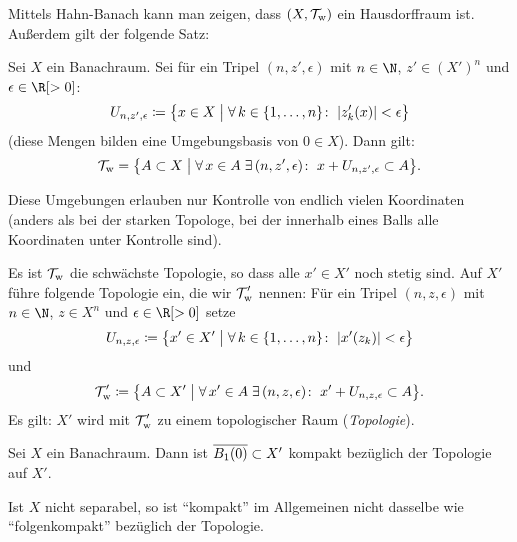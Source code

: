 \nnBemerkung
Mittels Hahn-Banach kann man zeigen, dass $(X,\operatorname{\mathcal{T}}_{\mkern-5mu\mathrm{w}})$ ein 
Hausdorffraum ist. Außerdem gilt der folgende Satz:

\begin{thSatz}
    Sei $X$ ein Banachraum.
    Sei für ein Tripel  $(n,z',\epsilon)$ mit $n\in\N$, 
    $z'\in (X')^n$ und $\epsilon\in\R[>0]$:
    \[ U_{n,z',\epsilon} \coloneqq \bigl\{
        x\in X \;\big\vert\; \forall\,k\in\{1,\ldots,n\}\colon \;
        \lvert z_k'(x)\rvert < \epsilon
        \bigr\}
    \]
    (diese Mengen bilden eine Umgebungsbasis von $0\in X$).
    Dann gilt:
    \[ \operatorname{\mathcal{T}}_{\mkern-5mu\mathrm{w}} = \bigl\{ A\subset X \;\big\vert\;
        \forall\,x\in A\; \exists\, (n,z',\epsilon)\colon\;
        x + U_{n,z',\epsilon} \subset A
        \bigr\}
    . \]
\end{thSatz}


%    

Diese Umgebungen erlauben nur Kontrolle von endlich vielen Koordinaten
(anders als bei der starken Topologe, bei der innerhalb eines Balls alle
Koordinaten unter Kontrolle sind).

\nnBemerkung
Es ist $\operatorname{\mathcal{T}}_{\mkern-5mu\mathrm{w}}$ die schwächste Topologie, so dass alle $x'\in X'$ noch stetig
sind. Auf $X'$ führe folgende Topologie ein, die wir $\operatorname{\mathcal{T}}_{\mkern-5mu\mathrm{w}}'$ nennen:
Für ein Tripel $(n,z,\epsilon)$ mit $n\in\N$, $z\in X^n$ und
$\epsilon\in\R[>0]$ setze
\[ U_{n,z,\epsilon} \coloneqq \bigl\{
    x'\in X' \;\big\vert\; \forall\,k\in\{1,\ldots,n\}\colon \;
    \lvert x'(z_k)\rvert < \epsilon
    \bigr\}
\]
und
\[ \operatorname{\mathcal{T}}_{\mkern-5mu\mathrm{w}}' \coloneqq \bigl\{ A\subset X' \;\big\vert\;
    \forall\,x'\in A\; \exists\, (n,z,\epsilon)\colon\;
    x' + U_{n,z,\epsilon} \subset A
    \bigr\}
. \]
%
Es gilt: $X'$ wird mit $\operatorname{\mathcal{T}}_{\mkern-5mu\mathrm{w}}'$ zu einem topologischer Raum
(\emph{\schwachstern Topologie}).

\begin{thSatz}
    Sei $X$ ein Banachraum. Dann ist $\overline{B_1(0)}\subset X'$
    kompakt bezüglich der \schwachstern Topologie auf $X'$.
\end{thSatz}

\nnBemerkung Ist $X$ nicht separabel, so ist \enquote{kompakt} im
Allgemeinen nicht dasselbe wie \enquote{folgenkompakt} bezüglich der
\schwachstern Topologie.
